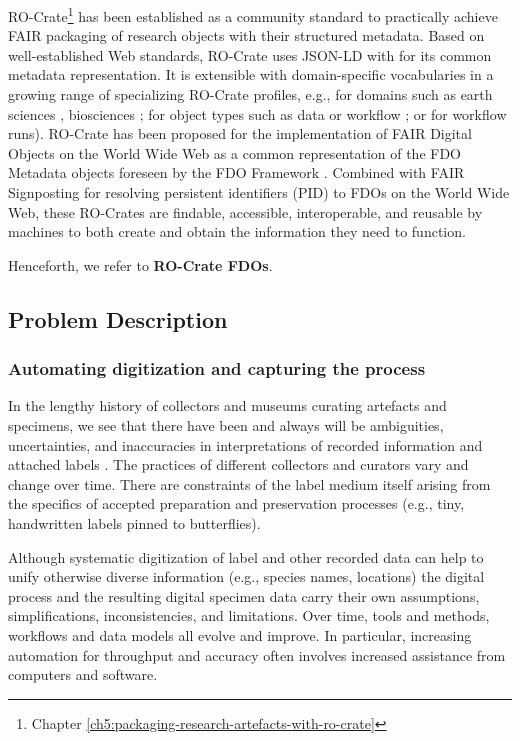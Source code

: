 RO-Crate\footnote{Chapter \vref{ch5:packaging-research-artefacts-with-ro-crate}} \cite{OCarragain 2019,Soiland-Reyes 2022} has been established as a community standard to
practically achieve FAIR packaging of research objects with their
structured metadata. Based on well-established Web standards, RO-Crate
uses JSON-LD \cite{ch8-50} with \cite{schema.org} for its common metadata representation. It is extensible with
domain-specific vocabularies in a growing range of specializing RO-Crate
profiles, e.g., for domains such as earth sciences \cite{ch8-52}, biosciences
\cite{Goble 2021}; for object types such as data or workflow \cite{Bacall 2021}; or for
workflow runs). RO-Crate has been proposed for the implementation of
FAIR Digital Objects on the World Wide Web as a common representation of
the FDO Metadata objects foreseen by the FDO Framework \cite{Goble 2021,bonino2019}.
Combined with FAIR Signposting \cite{Van de Sompel 2022} for resolving persistent
identifiers (PID) to FDOs on the World Wide Web, these RO-Crates are
findable, accessible, interoperable, and reusable by machines to both
create and obtain the information they need to function.

Henceforth, we refer to \textbf{RO-Crate FDOs}.

\subsection{Problem Description}\label{problem-description}

\subsubsection{Automating digitization and capturing the process}\label{automating-digitization-and-capturing-the-process}


In the lengthy history of collectors and museums curating artefacts and
specimens, we see that there have been and always will be ambiguities,
uncertainties, and inaccuracies in interpretations of recorded
information and attached labels \cite{ch8-56}. The practices of different
collectors and curators vary and change over time. There are constraints
of the label medium itself arising from the specifics of accepted
preparation and preservation processes (e.g., tiny, handwritten labels
pinned to butterflies).

Although systematic digitization of label and other recorded data can
help to unify otherwise diverse information (e.g., species names,
locations) the digital process and the resulting digital specimen data
carry their own assumptions, simplifications, inconsistencies, and
limitations. Over time, tools and methods, workflows and data models all
evolve and improve. In particular, increasing automation for throughput
and accuracy often involves increased assistance from computers and
software.

